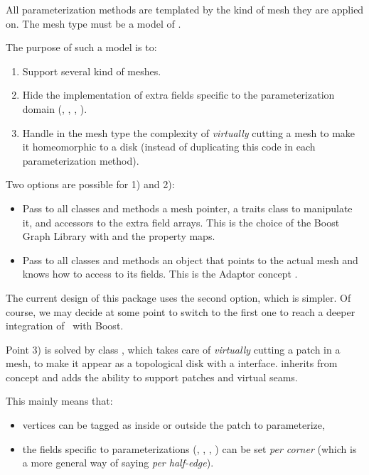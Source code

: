 All parameterization methods are templated by the kind of mesh they are applied on.
The mesh type must be a model of .

The purpose of such a model is to:
\begin{enumerate}
\item Support several kind of meshes.
\item Hide the implementation of extra fields specific to the parameterization domain
      (, , , ).
\item Handle in the mesh type the complexity of \emph{virtually} cutting a mesh
      to make it homeomorphic to a disk (instead of duplicating this
      code in each parameterization method).
\end{enumerate}

Two options are possible for 1) and 2):
\begin{itemize}
\item Pass to all classes and methods a mesh pointer, a traits class to manipulate it,
      and accessors to the extra field arrays.
      This is the choice of the Boost Graph Library with 
      and the property maps.
\item Pass to all classes and methods an object that points to the actual mesh and knows
      how to access to its fields. This is the Adaptor concept \cite{cgal:ghjv-dpero-95}.
\end{itemize}

The current design of this package uses the second option, which is simpler.
Of course, we may decide at some point to switch to the first one to reach a deeper integration
of \cgal\ with Boost.

Point 3) is solved by class ,
which takes care of \emph{virtually} cutting
a patch in a  mesh, to make it appear as a topological disk
with a  interface.
 inherits from concept  and adds
the ability to support patches and virtual seams.

This mainly means that:
\begin{itemize}
\item vertices can be tagged as inside or outside the patch to parameterize,
\item the fields specific to parameterizations (, , , )
      can be set {\em per corner} (which is a more general way of saying {\em per half-edge}).
\end{itemize}


